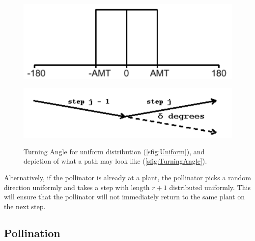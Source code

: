 \begin{figure}[h!]
  \begin{center}
  \begin{minipage}[b]{0.48\textwidth}
    \centering
    \includegraphics[scale=0.4]{Figures/UniformTADistribution.pdf}
     \label{sfig:Uniform}
  \end{minipage}
  \begin{minipage}[b]{0.48\textwidth}
    \centering
    \includegraphics[scale=0.5]{Figures/TurningAngle.pdf}
     \label{sfig:TurningAngle}
  \end{minipage}
  \end{center}
  \caption{Turning Angle for uniform distribution (\cref{sfig:Uniform}),
  and depiction of what a path may look like
  (\cref{sfig:TurningAngle}).}\label{fig:TurningAngle}
\end{figure}


Alternatively, if the pollinator is already at a plant, the pollinator picks a
random direction uniformly and takes a step with length $r+1$ distributed
uniformly.  This will ensure that the pollinator will not immediately return to
the same plant on the next step.

\subsection{Pollination}

